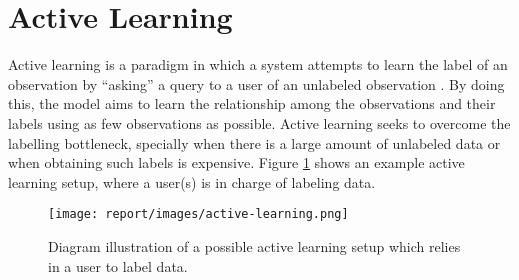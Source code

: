 \section{Active Learning} \label{sect:theory:active-learning}

Active learning is a paradigm in which a system attempts to learn the label of an observation by ``asking'' a query to a user of an unlabeled observation \cite{report:active-learning}. By doing this, the model aims to learn the relationship among the observations and their labels using as few observations as possible. Active learning seeks to overcome the labelling bottleneck, specially when there is a large amount of unlabeled data or when obtaining such labels is expensive. Figure \ref{fig:active-learning} shows an example active learning setup, where a user(s) is in charge of labeling data.

\begin{figure}[H]
  \centering
  \texttt{[image: report/images/active-learning.png]}
  \caption{Diagram illustration of a possible active learning setup which relies in a user to label data.}
  \label{fig:active-learning}
\end{figure}